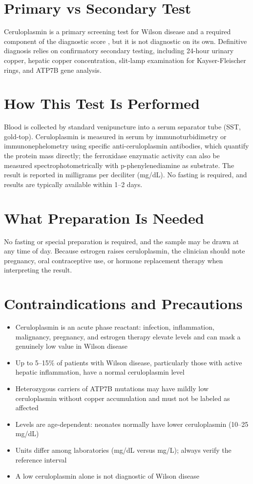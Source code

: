 \section*{Primary vs Secondary Test}
Ceruloplasmin is a primary screening test for Wilson disease and a required component of the diagnostic score \cite{easl2012easl}, but it is not diagnostic on its own. Definitive diagnosis relies on confirmatory secondary testing, including 24-hour urinary copper, hepatic copper concentration, slit-lamp examination for Kayser-Fleischer rings, and ATP7B gene analysis.
\section*{How This Test Is Performed}
Blood is collected by standard venipuncture into a serum separator tube (SST, gold-top). Ceruloplasmin is measured in serum by immunoturbidimetry or immunonephelometry using specific anti-ceruloplasmin antibodies, which quantify the protein mass directly; the ferroxidase enzymatic activity can also be measured spectrophotometrically with p-phenylenediamine as substrate. The result is reported in milligrams per deciliter (mg/dL). No fasting is required, and results are typically available within 1--2 days.
\section*{What Preparation Is Needed}
No fasting or special preparation is required, and the sample may be drawn at any time of day. Because estrogen raises ceruloplasmin, the clinician should note pregnancy, oral contraceptive use, or hormone replacement therapy when interpreting the result.
\section*{Contraindications and Precautions}
\begin{itemize}
  \item Ceruloplasmin is an acute phase reactant: infection, inflammation, malignancy, pregnancy, and estrogen therapy elevate levels and can mask a genuinely low value in Wilson disease
  \item Up to 5--15\% of patients with Wilson disease, particularly those with active hepatic inflammation, have a normal ceruloplasmin level
  \item Heterozygous carriers of ATP7B mutations may have mildly low ceruloplasmin without copper accumulation and must not be labeled as affected
  \item Levels are age-dependent: neonates normally have lower ceruloplasmin (10--25 mg/dL)
  \item Units differ among laboratories (mg/dL versus mg/L); always verify the reference interval
  \item A low ceruloplasmin alone is not diagnostic of Wilson disease
\end{itemize}
